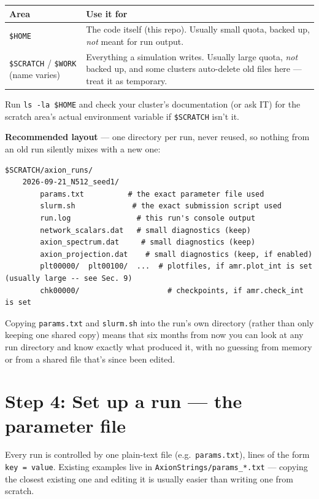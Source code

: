 \documentclass[11pt]{article}
\begin{document}
\begin{tabularx}{\textwidth}{@{}>{\raggedright\arraybackslash}p{3.1cm} X@{}}
\toprule
\textbf{Area} & \textbf{Use it for} \\
\midrule
\texttt{\$HOME} & The code itself (this repo). Usually small quota, backed up, \emph{not} meant for run
output. \\[0.15cm]
\texttt{\$SCRATCH} / \texttt{\$WORK} (name varies) & Everything a simulation writes. Usually large quota,
\emph{not} backed up, and some clusters auto-delete old files here --- treat it as temporary. \\
\bottomrule
\end{tabularx}

\vspace{0.3cm}
Run \texttt{ls -la \$HOME} and check your cluster's documentation (or ask IT) for the scratch area's
actual environment variable if \texttt{\$SCRATCH} isn't it.

\textbf{Recommended layout} --- one directory per run, never reused, so nothing from an old run silently
mixes with a new one:

\begin{lstlisting}
$SCRATCH/axion_runs/
    2026-09-21_N512_seed1/
        params.txt          # the exact parameter file used
        slurm.sh             # the exact submission script used
        run.log               # this run's console output
        network_scalars.dat   # small diagnostics (keep)
        axion_spectrum.dat     # small diagnostics (keep)
        axion_projection.dat    # small diagnostics (keep, if enabled)
        plt00000/  plt00100/  ...  # plotfiles, if amr.plot_int is set (usually large -- see Sec. 9)
        chk00000/                    # checkpoints, if amr.check_int is set
\end{lstlisting}

Copying \texttt{params.txt} and \texttt{slurm.sh} into the run's own directory (rather than only keeping
one shared copy) means that six months from now you can look at any run directory and know exactly what
produced it, with no guessing from memory or from a shared file that's since been edited.

\section{Step 4: Set up a run --- the parameter file}

Every run is controlled by one plain-text file (e.g.\ \texttt{params.txt}), lines of the form
\texttt{key = value}. Existing examples live in \texttt{AxionStrings/params\_*.txt} --- copying the closest
existing one and editing it is usually easier than writing one from scratch.
\end{document}
